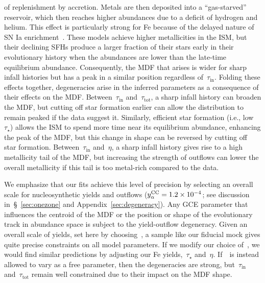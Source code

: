 \documentclass[foo.tex]{subfiles}
\begin{document}
of replenishment by accretion.
Metals are then deposited into a ``gas-starved'' reservoir, which then reaches
higher abundances due to a deficit of hydrogen and helium.
This effect is particularly strong for Fe because of the delayed nature of SN
Ia enrichment~\citep{Weinberg2017}.
These models achieve higher metallicities in the ISM, but their declining SFHs
produce a larger fraction of their stars early in their evolutionary history
when the abundances are lower than the late-time equilibrium abundance.
Consequently, the MDF that arises is wider for sharp infall histories but has
a peak in a similar position regardless of~$\tau_\text{in}$.
Folding these effects together, degeneracies arise in the inferred parameters
as a consequence of their effects on the MDF.
Between~$\tau_\text{in}$ and~$\tau_\text{tot}$, a sharp infall history can
broaden the MDF, but cutting off star formation earlier can allow the
distribution to remain peaked if the data suggest it.
Similarly, efficient star formation (i.e., low~$\tau_\star$) allows the ISM to
spend more time near its equilibrium abundance, enhancing the peak of the MDF,
but this change in shape can be reversed by cutting off star formation.
Between~$\tau_\text{in}$ and~$\eta$, a sharp infall history gives rise to a
high metallicity tail of the MDF, but increasing the strength of outflows
can lower the overall metallicity if this tail is too metal-rich compared to
the data.
\par
We emphasize that our fits achieve this level of precision by selecting an
overall scale for nucleosynthetic yields and outflows
($y_\alpha^\text{CC} = 1.2\times10^{-4}$; see
discussion in~\S~\ref{sec:onezone} and Appendix~\ref{sec:degeneracy}).
Any GCE parameter that influences the centroid of the MDF or the position or
shape of the evolutionary track in abundance space is subject to the
yield-outflow degeneracy.
Given an overall scale of yields, set here by choosing~\yacc, a sample like
our fiducial mock gives quite precise constraints on all model parameters.
If we modify our choice of~\yacc, we would find similar predictions by
adjusting our Fe yields,~$\tau_\star$ and~$\eta$.
If~\yacc~is instead allowed to vary as a free parameter, then the degeneracies
are strong, but~$\tau_\text{in}$ and~$\tau_\text{tot}$ remain well constrained
due to their impact on the MDF shape.
\end{document}
